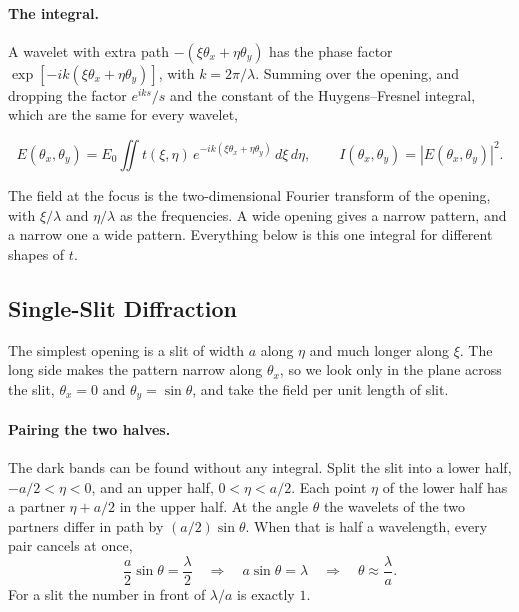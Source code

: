 \paragraph{The integral.} A wavelet with extra path $-(\xi\theta_x+\eta\theta_y)$ has the phase factor $\exp[-ik(\xi\theta_x+\eta\theta_y)]$, with $k=2\pi/\lambda$. Summing over the opening, and dropping the factor $e^{iks}/s$ and the constant of the Huygens--Fresnel integral, which are the same for every wavelet,
\begin{keyresult}
	\begin{equation}
		E(\theta_x,\theta_y) = E_0\iint t(\xi,\eta)\,e^{-ik(\xi\theta_x+\eta\theta_y)}\,d\xi\,d\eta, \qquad I(\theta_x,\theta_y) = |E(\theta_x,\theta_y)|^2 .
		\label{eq:fourier_optics_integral}
	\end{equation}
\end{keyresult}
The field at the focus is the two-dimensional Fourier transform of the opening, with $\xi/\lambda$ and $\eta/\lambda$ as the frequencies. A wide opening gives a narrow pattern, and a narrow one a wide pattern. Everything below is this one integral for different shapes of $t$.

\subsection{Single-Slit Diffraction}

The simplest opening is a slit of width $a$ along $\eta$ and much longer along $\xi$. The long side makes the pattern narrow along $\theta_x$, so we look only in the plane across the slit, $\theta_x=0$ and $\theta_y=\sin\theta$, and take the field per unit length of slit.

\paragraph{Pairing the two halves.} The dark bands can be found without any integral. Split the slit into a lower half, $-a/2<\eta<0$, and an upper half, $0<\eta<a/2$. Each point $\eta$ of the lower half has a partner $\eta+a/2$ in the upper half. At the angle $\theta$ the wavelets of the two partners differ in path by $(a/2)\sin\theta$. When that is half a wavelength, every pair cancels at once,
\begin{equation}
	\frac{a}{2}\sin\theta = \frac{\lambda}{2} \quad\Longrightarrow\quad a\sin\theta = \lambda \quad\Longrightarrow\quad \theta \approx \frac{\lambda}{a}.
	\label{eq:single_slit_minimum}
\end{equation}
For a slit the number in front of $\lambda/a$ is exactly $1$.

